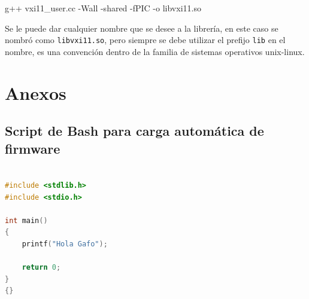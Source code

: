 \documentclass[paper=letter,oneside,fontsize=11pt, parskip=full]{scrartcl}
\newenvironment{code}
	{\begin{adjustwidth}{1.0cm}{0.0cm}\ttfamily}
	{\end{adjustwidth}}
\begin{document}
	\begin{code}
		g++ vxi11\_user.cc -Wall -shared -fPIC -o libvxi11.so
	\end{code}
	
	Se le puede dar cualquier nombre que se desee a la librería, en este caso se nombró como \texttt{libvxi11.so}, pero siempre se debe utilizar el prefijo \texttt{lib} en el nombre, es una convención dentro de la familia de sistemas operativos unix-linux.	
	
	
			
	\section{Anexos}	
		
		\subsection{Script de Bash para carga automática de firmware}
	
			\begin{lstlisting}[language=c,caption={Listado programa}]
	
#include <stdlib.h>
#include <stdio.h>

int main()
{
	printf("Hola Gafo");
	
	return 0;
}
{}
		\end{lstlisting}
\end{document}
